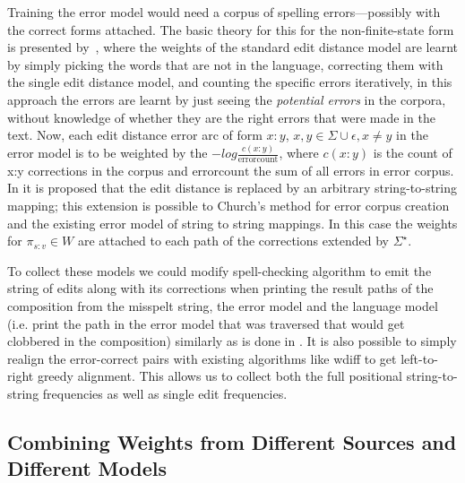 \documentclass[a4paper,12pt]{article}
\begin{document}
Training the error model would need a corpus of spelling
errors---possibly with the correct forms attached. The basic theory for this
for the non-finite-state form is presented by~\cite{church1991probability},
where the weights of the standard edit distance model are learnt by simply
picking the words that are not in the language, correcting them with the single
edit distance model, and counting the specific errors iteratively, in this
approach the errors are learnt by just seeing the \emph{potential errors} in
the corpora, without knowledge of whether they are the right errors that were
made in the text.  Now, each edit distance error arc of form $x:y$, $x, y \in
\Sigma \cup {\epsilon}, x \neq y$ in the error model is to be weighted by the $-log
\frac{c(x:y)}{\mathrm{error count}}$, where $c(x:y)$ is the count of x:y
corrections in the corpus and $\mathrm{error count}$ the sum of all errors in
error corpus. In \cite{brill2000improved} it is proposed that the
edit distance is replaced by an arbitrary string-to-string mapping; this
extension is possible to Church's method for error corpus creation and
the existing error model of string to string mappings. In this case the
weights for $\pi_{s:v} \in W$ are attached to each path of the corrections
extended by $\Sigma^{\star}$. 

To collect these models we could modify spell-checking algorithm to emit the
string of edits along with its corrections when printing the result paths of
the composition from the misspelt string, the error model and the language
model (i.e. print the path in the error model that was traversed that would get
clobbered in the composition) similarly as is done in
\cite{ristad1998learning}. It is also possible to simply realign the
error-correct pairs with existing algorithms like wdiff to get left-to-right
greedy alignment. This allows us to collect both the full positional
string-to-string frequencies as well as single edit frequencies.

\subsection{Combining Weights from Different Sources and Different Models}
\label{subsec:combining-weights}
\end{document}
